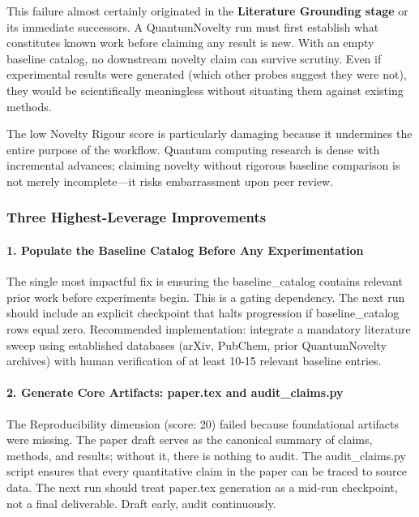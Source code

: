 \documentclass[10pt,letterpaper]{article}
\begin{document}
This failure almost certainly originated in the \textbf{Literature Grounding stage} or its immediate successors. A QuantumNovelty run must first establish what constitutes known work before claiming any result is new. With an empty baseline catalog, no downstream novelty claim can survive scrutiny. Even if experimental results were generated (which other probes suggest they were not), they would be scientifically meaningless without situating them against existing methods.

The low Novelty Rigour score is particularly damaging because it undermines the entire purpose of the workflow. Quantum computing research is dense with incremental advances; claiming novelty without rigorous baseline comparison is not merely incomplete---it risks embarrassment upon peer review.

\hypertarget{three-highest-leverage-improvements}{%
\subsubsection{Three Highest-Leverage Improvements}\label{three-highest-leverage-improvements}}

\hypertarget{populate-the-baseline-catalog-before-any-experimentation}{%
\paragraph{1. Populate the Baseline Catalog Before Any Experimentation}\label{populate-the-baseline-catalog-before-any-experimentation}}

The single most impactful fix is ensuring the baseline\_catalog contains relevant prior work before experiments begin. This is a gating dependency. The next run should include an explicit checkpoint that halts progression if baseline\_catalog rows equal zero. Recommended implementation: integrate a mandatory literature sweep using established databases (arXiv, PubChem, prior QuantumNovelty archives) with human verification of at least 10-15 relevant baseline entries.

\hypertarget{generate-core-artifacts-paper.tex-and-audit_claims.py}{%
\paragraph{2. Generate Core Artifacts: paper.tex and audit\_claims.py}\label{generate-core-artifacts-paper.tex-and-audit_claims.py}}

The Reproducibility dimension (score: 20) failed because foundational artifacts were missing. The paper draft serves as the canonical summary of claims, methods, and results; without it, there is nothing to audit. The audit\_claims.py script ensures that every quantitative claim in the paper can be traced to source data. The next run should treat paper.tex generation as a mid-run checkpoint, not a final deliverable. Draft early, audit continuously.
\end{document}
